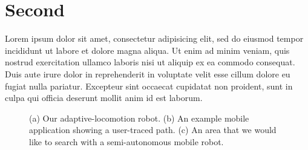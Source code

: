 \documentclass{proposal}
\begin{document}
\section{Second}
Lorem ipsum dolor sit amet, consectetur adipisicing elit, sed do eiusmod
tempor incididunt ut labore et dolore magna aliqua. Ut enim ad minim veniam,
quis nostrud exercitation ullamco laboris nisi ut aliquip ex ea commodo
consequat. Duis aute irure dolor in reprehenderit in voluptate velit esse
cillum dolore eu fugiat nulla pariatur. Excepteur sint occaecat cupidatat non
proident, sunt in culpa qui officia deserunt mollit anim id est laborum.

\begin{figure}
    \centering
    \hfil%
    \hfil%
    \caption{(a) Our adaptive-locomotion robot. (b) An example mobile application showing a user-traced path. (c) An area that we would like to search with a semi-autonomous mobile robot.}
    \label{fig:application}
\end{figure}
\end{document}

